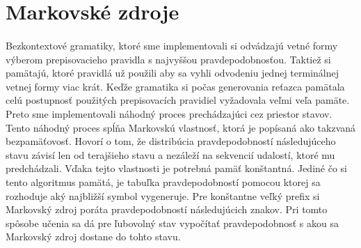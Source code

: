 \section{Markovské zdroje}
\paragraph{}
Bezkontextové gramatiky, ktoré sme implementovali si odvádzajú vetné formy výberom prepisovacieho pravidla s najvyššou pravdepodobnosťou. Taktiež si pamätajú, ktoré pravidlá už použili aby sa vyhli odvodeniu jednej terminálnej vetnej formy viac krát. Keďže gramatika si počas generovania reťazca pamätala celú postupnosť použitých prepisovacích pravidiel vyžadovala veľmi veľa pamäte. Preto sme implementovali náhodný proces prechádzajúci cez priestor stavov. Tento náhodný proces spĺňa Markovskú vlastnosť, ktorá je popísaná ako takzvaná bezpamäťovosť. Hovorí o tom, že distribúcia pravdepodobností následujúceho stavu závisí len od terajšieho stavu a nezáleží na sekvencií udalostí, ktoré mu predchádzali. Vďaka tejto vlastnosti je potrebná pamäť konštantná. Jediné čo si tento algoritmus pamätá, je tabuľka pravdepodobností pomocou ktorej sa rozhoduje aký najbližší symbol vygeneruje. Pre konštantne veľký prefix si Markovský zdroj poráta pravdepodobností následujúcich znakov. Pri tomto spôsobe učenia sa dá pre ľubovolný stav vypočítať pravdepodobnosť s akou sa Markovský zdroj dostane do tohto stavu.